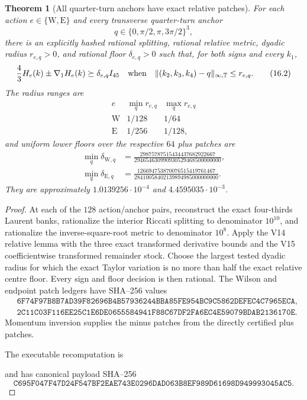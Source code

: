 \documentclass[11pt,oneside]{article}
\newtheorem{theorem}{Theorem}[section]
\theoremstyle{definition}
\theoremstyle{remark}
\begin{document}
\begin{theorem}[All quarter-turn anchors have exact relative patches]
\label{thm:newv16-atlas}
For each action \(e\in\{\mathrm W,\mathrm E\}\) and every transverse
quarter-turn anchor
\[
 q\in\{0,\pi/2,\pi,3\pi/2\}^3,                           \tag{16.1}
\]
there is an explicitly hashed rational splitting, rational relative
metric, dyadic radius \(r_{e,q}>0\), and rational floor
\(\delta_{e,q}>0\) such that, for both signs and every \(k_1\),
\[
 \frac43H_e(k)\pm\nabla_1H_e(k)\succeq\delta_{e,q}I_{45}
 \quad\hbox{when}\quad
 \|(k_2,k_3,k_4)-q\|_{\infty,\mathbb T}\le r_{e,q}.        \tag{16.2}
\]
The radius ranges are
\[
\begin{array}{c|cc}
e&\min_q r_{e,q}&\max_q r_{e,q}\\ \hline
\mathrm W&1/128&1/64\\
\mathrm E&1/256&1/128,
\end{array}                                               \tag{16.3}
\]
and uniform lower floors over the respective \(64\) plus patches are
\[
\begin{aligned}
 \min_q\delta_{\mathrm W,q}
 &=
 \frac{29875787515434437682922667}
 {294654630990930529468500000000},\\
 \min_q\delta_{\mathrm E,q}
 &=
 \frac{126694753870076515419761467}
 {28410058402139894985000000000}.
\end{aligned}                                             \tag{16.4}
\]
They are approximately \(1.0139256\cdot10^{-4}\) and
\(4.4595035\cdot10^{-3}\).
\end{theorem}

\begin{proof}
At each of the \(128\) action/anchor pairs, reconstruct the exact
four-thirds Laurent banks, rationalize the interior Riccati splitting
to denominator \(10^{10}\), and rationalize the inverse-square-root
metric to denominator \(10^8\).  Apply the V14 relative lemma with
the three exact transformed derivative bounds and the V15
coefficientwise transformed remainder stock.  Choose the largest
tested dyadic radius for which the exact Taylor variation is no more
than half the exact relative centre floor.  Every sign and floor
decision is then rational.  The Wilson and endpoint patch ledgers
have SHA--256 values
\[
\begin{aligned}
&\texttt{6F74F97B8B7AD39F82696B4B57936244BBA85FE954BC9C5862DEFEC4C7965ECA},\\
&\texttt{2C11C03F116EE25C1E6DE0655584941F88C67DF2FA6EC4E59079BDAB2136170E}.
\end{aligned}                                             \tag{16.5}
\]
Momentum inversion supplies the minus patches from the directly
certified plus patches.

The executable recomputation is
\begin{center}
\footnotesize
{}
\end{center}
and has canonical payload SHA--256
\[
\texttt{C695F047F47D24F547BF2EAE743E0296DAD063B8EF989D61698D949993045AC5}.
                                                               \tag{16.6}
\]
\end{proof}
\end{document}
